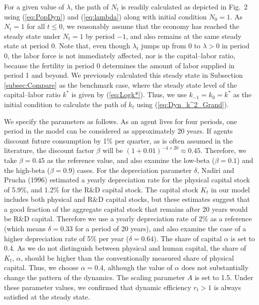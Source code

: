 \documentclass[nogrid]{MBE}%
\begin{document}
{For a given value of $\lambda$, the path of $N_{t}$ is readily calculated as depicted in Fig.~2
using (\ref{eq:PopDyn}) and (\ref{eq:lambda}) along with initial condition $N_{0}=1$. As $N_{t}=1$
for all $t\leq0$, we reasonably assume that the economy has reached the steady state under
$N_{t}=1$ by period $-1$, and also remains at the same steady state at period 0. {Note that, even
though $\lambda_{t}$ jumps up from 0 to $\lambda>0$ in period 0, the labor force is not
immediately affected, nor is the capital--labor ratio, because the fertility in period 0
determines the amount of labor supplied in period 1 and beyond.} We previously calculated this
steady state in Subsection \ref{subsec:Compare} as the benchmark case, where the steady state
level of the capital--labor ratio $k^{\ast}$ is given by (\ref{eq:Logk*}). Thus, we use
$k_{-1}=k_{0}=k^{\ast}$ as the initial condition to calculate the path of $k_{t}$ using
(\ref{eq:Dyn_k^2_Grand}).

We specify the parameters as follows. As an agent lives for four periods, one period in the model
can be considered as approximately 20 years. If agents discount future consumption by 1\% per
quarter, as is often assumed in the literature, the discount factor $\beta$ will be $(1+0.01)^{-4
\times20} \approx0.45$. Therefore, we take $\beta=0.45$ as the reference value, and also examine
the low-beta ($\beta=0.1$) and the high-beta ($\beta=0.9$) cases. For the depreciation parameter
$\delta$, Nadiri and Prucha (1996) estimated a yearly depreciation rate for the physical capital
stock of 5.9\%, and 1.2\% for the R\&D capital stock. The capital stock $K_{t}$ in our model
includes both physical and R\&D capital stocks, but these estimates suggest that a good fraction
of the aggregate capital stock that remains after 20 years would be R\&D capital. Therefore we use
a yearly depreciation rate of 2\% as a reference (which means $\delta=0.33$ for a period of 20
years), and also examine the case of a higher depreciation rate of 5\% per year ($\delta =0.64$).
The share of capital $\alpha$ is set to 0.4. {As we do not distinguish between physical and human
capital, the share of $K_{t}$, $\alpha $, should be higher than the conventionally measured share
of physical capital. Thus, we choose $\alpha=0.4$, although the value of $\alpha$ does not
substantially change the pattern of the dynamics. The scaling parameter $A$ is set to 1.5. Under
these parameter values, we confirmed that dynamic efficiency $r_{t}>1$ is always satisfied at the
steady state.}

}
\end{document}
